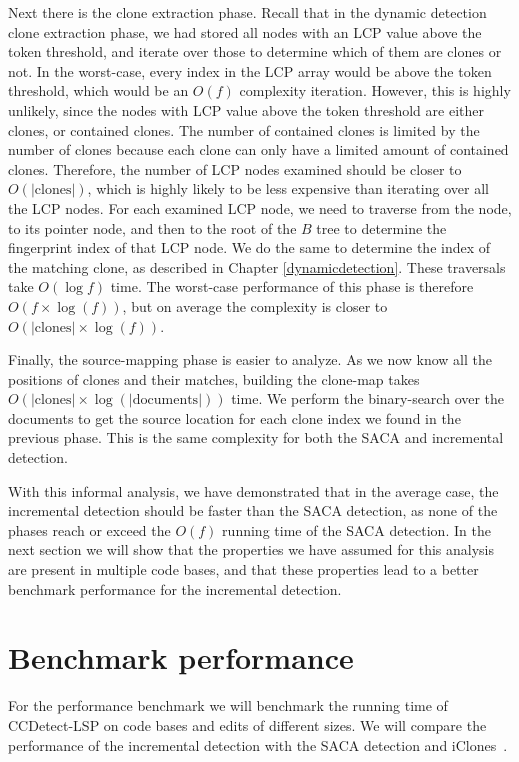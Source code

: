 Next there is the clone extraction phase. Recall that in the dynamic detection clone
extraction phase, we had stored all nodes with an LCP value above the token threshold, and
iterate over those to determine which of them are clones or not. In the worst-case, every
index in the LCP array would be above the token threshold, which would be an $O(f)$
complexity iteration. However, this is highly unlikely, since the nodes with LCP value
above the token threshold are either clones, or contained clones. The number of contained
clones is limited by the number of clones because each clone can only have a limited
amount of contained clones. Therefore, the number of LCP nodes examined should be closer
to $O(\vert\text{clones}\vert)$, which is highly likely to be less expensive than
iterating over all the LCP nodes. For each examined LCP node, we need to traverse from the
node, to its pointer node, and then to the root of the $B$ tree to determine the
fingerprint index of that LCP node. We do the same to determine the index of the matching
clone, as described in Chapter \ref{dynamicdetection}. These traversals take $O(\log f)$
time. The worst-case performance of this phase is therefore $O(f \times \log(f))$, but on
average the complexity is closer to $O(\vert\text{clones}\vert \times \log(f))$.

Finally, the source-mapping phase is easier to analyze. As we now know all the positions
of clones and their matches, building the clone-map takes $O(\vert\text{clones}\vert
\times \log(\vert\text{documents}\vert))$ time. We perform the binary-search over the
documents to get the source location for each clone index we found in the previous phase.
This is the same complexity for both the SACA and incremental detection.

With this informal analysis, we have demonstrated that in the average case, the
incremental detection should be faster than the SACA detection, as none of the phases
reach or exceed the $O(f)$ running time of the SACA detection. In the next section we will
show that the properties we have assumed for this analysis are present in multiple code
bases, and that these properties lead to a better benchmark performance for the
incremental detection.

\section{Benchmark performance}

For the performance benchmark we will benchmark the running time of CCDetect-LSP on code
bases and edits of different sizes. We will compare the performance of the incremental
detection with the SACA detection and iClones~\cite{GodeIncrementalCloneDetection}.


